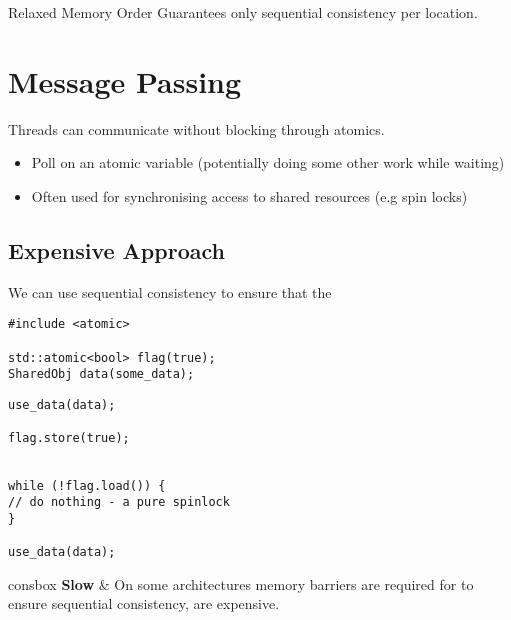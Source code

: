 \begin{definitionbox}{Relaxed Memory Order}
  Guarantees only sequential consistency per location.
\end{definitionbox}

\section{Message Passing}
Threads can communicate without blocking through atomics.
\begin{itemize}
  \item Poll on an atomic variable (potentially doing some other work while waiting)
  \item Often used for synchronising access to shared resources (e.g spin locks)
\end{itemize} 

\subsection{Expensive Approach}
We can use sequential consistency to ensure that the 
\begin{verbatim}  
#include <atomic>

std::atomic<bool> flag(true);
SharedObj data(some_data);
\end{verbatim}
\begin{minipage}{.49\textwidth}
  \begin{verbatim}
use_data(data);

flag.store(true);


  \end{verbatim}
\end{minipage}
\hfill
\begin{minipage}{.49\textwidth}
  \begin{verbatim}
while (!flag.load()) {
// do nothing - a pure spinlock
}

use_data(data);
  \end{verbatim}
\end{minipage}

\begin{tabbox}{consbox}
  \textbf{Slow} &  On some architectures memory barriers are required for to ensure sequential consistency, are expensive. \\
\end{tabbox}

